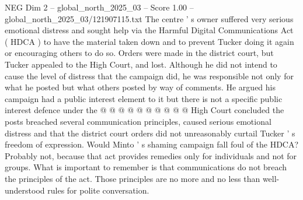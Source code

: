\begin{textsample}{NEG Dim 2 – global\_north\_2025\_03 – Score 1.00 – global\_north\_2025\_03/121907115.txt}
The centre ' s owner suffered very serious emotional distress and sought help via the Harmful Digital Communications Act ( HDCA ) to have the material taken down and to prevent Tucker doing it again or encouraging others to do so.
Orders were made in the district court, but Tucker appealed to the High Court, and lost.
Although he did not intend to cause the level of distress that the campaign did, he was responsible not only for what he posted but what others posted by way of comments.
He argued his campaign had a public interest element to it but there is not a specific public interest defence under the @ @ @ @ @ @ @ @ @ @ High Court concluded the posts breached several communication principles, caused serious emotional distress and that the district court orders did not unreasonably curtail Tucker ' s freedom of expression.
Would Minto ' s shaming campaign fall foul of the HDCA?
Probably not, because that act provides remedies only for individuals and not for groups.
What is important to remember is that communications do not breach the principles of the act.
Those principles are no more and no less than well-understood rules for polite conversation.

\end{textsample}

